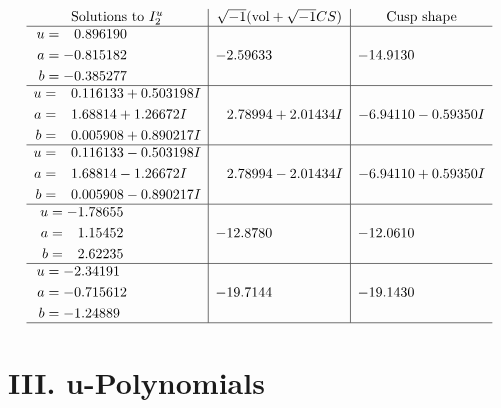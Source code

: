\documentclass[1p]{elsarticle_modified}
\theoremstyle{definition}
\newcommand{\I}{\sqrt{-1}}
\begin{document}
$$\begin{array}{c|c|c}  
\text{Solutions to }I^u_{2}& \I (\text{vol} + \sqrt{-1}CS) & \text{Cusp shape}\\
 \hline 
\begin{aligned}
u &= \phantom{-}0.896190\phantom{ +0.000000I} \\
a &= -0.815182\phantom{ +0.000000I} \\
b &= -0.385277\phantom{ +0.000000I}\end{aligned}
 & -2.59633\phantom{ +0.000000I} & -14.9130\phantom{ +0.000000I} \\ \hline\begin{aligned}
u &= \phantom{-}0.116133 + 0.503198 I \\
a &= \phantom{-}1.68814 + 1.26672 I \\
b &= \phantom{-}0.005908 + 0.890217 I\end{aligned}
 & \phantom{-}2.78994 + 2.01434 I & -6.94110 - 0.59350 I \\ \hline\begin{aligned}
u &= \phantom{-}0.116133 - 0.503198 I \\
a &= \phantom{-}1.68814 - 1.26672 I \\
b &= \phantom{-}0.005908 - 0.890217 I\end{aligned}
 & \phantom{-}2.78994 - 2.01434 I & -6.94110 + 0.59350 I \\ \hline\begin{aligned}
u &= -1.78655\phantom{ +0.000000I} \\
a &= \phantom{-}1.15452\phantom{ +0.000000I} \\
b &= \phantom{-}2.62235\phantom{ +0.000000I}\end{aligned}
 & -12.8780\phantom{ +0.000000I} & -12.0610\phantom{ +0.000000I} \\ \hline\begin{aligned}
u &= -2.34191\phantom{ +0.000000I} \\
a &= -0.715612\phantom{ +0.000000I} \\
b &= -1.24889\phantom{ +0.000000I}\end{aligned}
 & -19.7144\phantom{ +0.000000I} & -19.1430\phantom{ +0.000000I}\\
 \hline 
 \end{array}$$\newpage
\newpage\renewcommand{\arraystretch}{1}
\centering \section*{ III. u-Polynomials}
\end{document}
